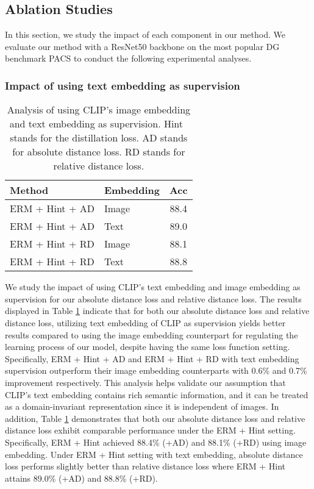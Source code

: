 \documentclass[10pt,twocolumn,letterpaper]{article}
\begin{document}
\subsection{Ablation Studies}

In this section, we study the impact of each component in our method. We evaluate our method with a ResNet50 backbone on the most popular DG benchmark PACS to conduct the following experimental analyses.

\subsubsection{Impact of using text embedding as supervision}

\begin{table}[htbp]
\begin{center}
\footnotesize
\begin{tabular}{l | l |  c }
\hline
Method & Embedding  & Acc \\
\hline \hline
ERM + Hint + AD & Image  & 88.4\\
\rowcolor{lightgray!30}ERM + Hint + AD & Text  & 89.0\\
\hline
ERM + Hint + RD & Image  & 88.1\\
\rowcolor{lightgray!30}ERM + Hint + RD & Text  & 88.8\\
\hline
\end{tabular}
\vspace{5pt}
\caption{Analysis of using CLIP's image embedding and text embedding as supervision. Hint~\cite{hinton2015distilling} stands for the distillation loss. AD stands for absolute distance loss. RD stands for relative distance loss.}
\label{table:textregu}
\end{center}
\end{table}

We study the impact of using CLIP's text embedding and image embedding as supervision for our absolute distance loss and relative distance loss.
The results displayed in Table \ref{table:textregu} indicate that for both our absolute distance loss and relative distance loss, utilizing text embedding of CLIP as supervision yields better results compared to using the image embedding counterpart for regulating the learning process of our model, despite having the same loss function setting. Specifically, ERM + Hint + AD and ERM + Hint + RD with text embedding supervision outperform their image embedding counterparts with 0.6\% and 0.7\% improvement respectively. This analysis helps validate our assumption that CLIP's text embedding contains rich semantic information, and it can be treated as a domain-invariant representation since it is independent of images.
In addition, Table \ref{table:textregu} demonstrates that both our absolute distance loss and relative distance loss exhibit comparable performance under the ERM + Hint setting. Specifically, ERM + Hint achieved 88.4\% (+AD) and 88.1\% (+RD) using image embedding. Under ERM + Hint setting with text embedding, absolute distance loss performs slightly better than relative distance loss where ERM + Hint attains 89.0\% (+AD) and 88.8\% (+RD).
\end{document}
